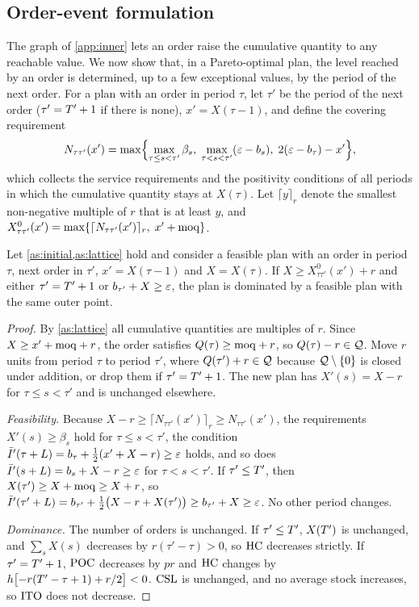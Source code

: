 \subsection{Order-event formulation}\label{app:event}

The graph of \cref{app:inner} lets an order raise the cumulative quantity to any reachable
value. We now show that, in a Pareto-optimal plan, the level reached by an order is
determined, up to a few exceptional values, by the period of the next order. For a plan
with an order in period $\tau$, let $\tau'$ be the period of the next order ($\tau'=T'+1$ if
there is none), $x'=X(\tau-1)$, and define the covering requirement
\begin{equation}\label{eq:cover}
  N_{\tau\tau'}(x')=\max\Bigl\{\max_{\tau\le s<\tau'}\beta_s,\;
    \max_{\tau<s<\tau'}(\varepsilon-b_s),\; 2(\varepsilon-b_\tau)-x'\Bigr\},
\end{equation}
which collects the service requirements and the positivity conditions of all periods in
which the cumulative quantity stays at $X(\tau)$. Let $\lceil y\rceil_r$ denote the smallest
non-negative multiple of $r$ that is at least $y$, and
$X^0_{\tau\tau'}(x')=\max\{\lceil N_{\tau\tau'}(x')\rceil_r,\;x'+\mathrm{moq}\}$.

\begin{lemma}\label{lem:cover}
  Let \cref{as:initial,as:lattice} hold and consider a feasible plan with an order in period
  $\tau$, next order in $\tau'$, $x'=X(\tau-1)$ and $X=X(\tau)$. If
  $X\ge X^0_{\tau\tau'}(x')+r$ and either $\tau'=T'+1$ or $b_{\tau'}+X\ge\varepsilon$, the plan is
  dominated by a feasible plan with the same outer point.
\end{lemma}

\begin{proof}
  By \cref{as:lattice} all cumulative quantities are multiples of $r$. Since
  $X\ge x'+\mathrm{moq}+r$, the order satisfies $Q(\tau)\ge\mathrm{moq}+r$, so $Q(\tau)-r\in\mathcal{Q}$. Move $r$
  units from period $\tau$ to period $\tau'$, where $Q(\tau')+r\in\mathcal{Q}$ because $\mathcal{Q}\setminus\{0\}$
  is closed under addition, or drop them if $\tau'=T'+1$. The new plan has $X'(s)=X-r$ for
  $\tau\le s<\tau'$ and is unchanged elsewhere.

  \emph{Feasibility.} Because $X-r\ge\lceil N_{\tau\tau'}(x')\rceil_r\ge N_{\tau\tau'}(x')$, the
  requirements $X'(s)\ge\beta_s$ hold for $\tau\le s<\tau'$, the condition
  $\bar I'(\tau+L)=b_\tau+\tfrac12(x'+X-r)\ge\varepsilon$ holds, and so does
  $\bar I'(s+L)=b_s+X-r\ge\varepsilon$ for $\tau<s<\tau'$. If $\tau'\le T'$, then
  $X(\tau')\ge X+\mathrm{moq}\ge X+r$, so
  $\bar I'(\tau'+L)=b_{\tau'}+\tfrac12\bigl(X-r+X(\tau')\bigr)\ge b_{\tau'}+X\ge\varepsilon$. No other
  period changes.

  \emph{Dominance.} The number of orders is unchanged. If $\tau'\le T'$, $X(T')$ is unchanged,
  and $\sum_sX(s)$ decreases by $r(\tau'-\tau)>0$, so $\mathrm{HC}$ decreases strictly. If $\tau'=T'+1$,
  $\mathrm{POC}$ decreases by $pr$ and $\mathrm{HC}$ changes by $h\bigl[-r(T'-\tau+1)+r/2\bigr]<0$. $\mathrm{CSL}$ is
  unchanged, and no average stock increases, so $\mathrm{ITO}$ does not decrease.
\end{proof}

